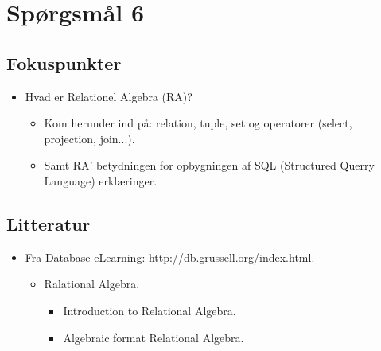 \section{Spørgsmål 6}


\subsection{Fokuspunkter}
\begin{itemize}
	\item Hvad er Relationel Algebra (RA)?
	\begin{itemize}
		\item Kom herunder ind på: relation, tuple, set og operatorer (select, projection, join...).
		\item Samt RA' betydningen for opbygningen af  SQL (Structured Querry Language) erklæringer.
	\end{itemize}
\end{itemize}

\subsection{Litteratur}
\begin{itemize}
	
	
	\item Fra Database eLearning: \url{http://db.grussell.org/index.html}.
	\begin{itemize}
		\item Ralational Algebra.
		\begin{itemize}
			\item Introduction to Relational Algebra.
			\item Algebraic format Relational Algebra.
		\end{itemize}
	\end{itemize}
	
%	
\end{itemize}

